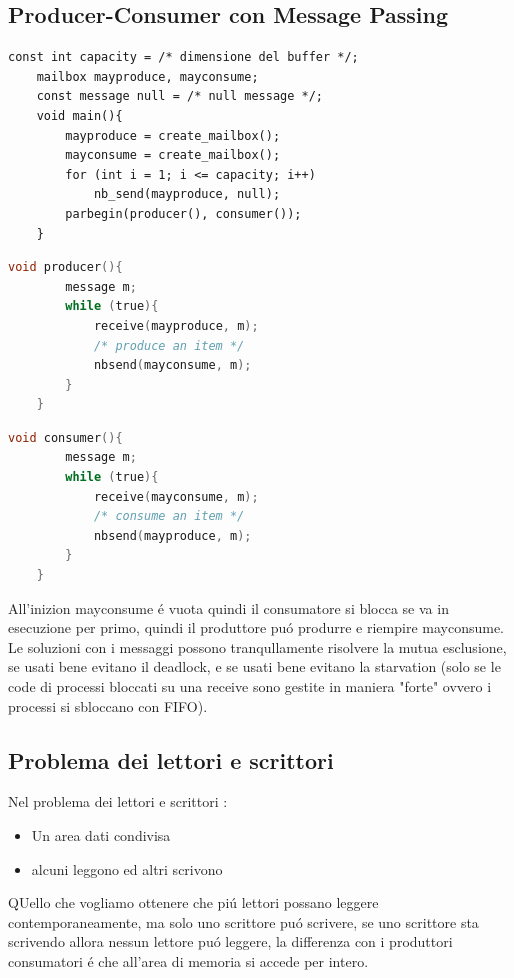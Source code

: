 \subsection{Producer-Consumer con Message Passing}
\begin{lstlisting}[languace = C]
    const int capacity = /* dimensione del buffer */;
    mailbox mayproduce, mayconsume;
    const message null = /* null message */;
    void main(){
        mayproduce = create_mailbox();
        mayconsume = create_mailbox();
        for (int i = 1; i <= capacity; i++)
            nb_send(mayproduce, null);
        parbegin(producer(), consumer());
    }
\end{lstlisting}
\begin{lstlisting}[language = C]
    void producer(){
        message m;
        while (true){
            receive(mayproduce, m);
            /* produce an item */
            nbsend(mayconsume, m);
        }
    }
\end{lstlisting}
\begin{lstlisting}[language = C]
    void consumer(){
        message m;
        while (true){
            receive(mayconsume, m);
            /* consume an item */
            nbsend(mayproduce, m);
        }
    }
\end{lstlisting}
All'inizion mayconsume é vuota quindi il consumatore si blocca se va in esecuzione per primo, quindi il produttore puó produrre e riempire mayconsume.
Le soluzioni con i messaggi possono tranqullamente risolvere la mutua esclusione, se usati bene evitano il deadlock, e se usati bene
evitano la starvation (solo se le code di processi bloccati su una receive sono gestite in maniera "forte" ovvero i processi si sbloccano con FIFO).

\subsection{Problema dei lettori e scrittori}
Nel problema dei lettori e scrittori :
\begin{itemize}
    \item Un area dati condivisa
    \item alcuni leggono ed altri scrivono
\end{itemize}
QUello che vogliamo ottenere che piú lettori possano leggere contemporaneamente, ma solo uno scrittore puó scrivere, se uno scrittore
sta scrivendo allora nessun lettore puó leggere, la differenza con i produttori consumatori é che all'area di memoria si accede per intero.

